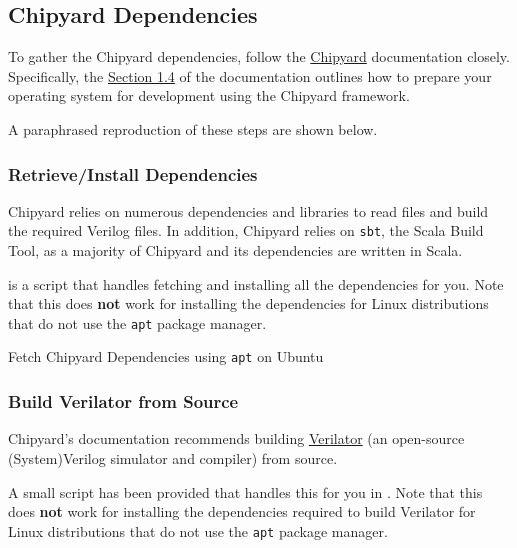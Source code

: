 \subsection{Chipyard Dependencies}\label{sec:Chipyard_Dependencies}
To gather the Chipyard dependencies, follow the \href{https://chipyard.readthedocs.io/en/latest/}{Chipyard} documentation closely.
Specifically, the \href{https://chipyard.readthedocs.io/en/latest/Chipyard-Basics/Initial-Repo-Setup.html}{Section 1.4} of the documentation outlines how to prepare your operating system for development using the Chipyard framework.

A paraphrased reproduction of these steps are shown below.

\subsubsection{Retrieve/Install Dependencies}\label{sec:Retrive_Install_Dependencies}
Chipyard relies on numerous dependencies and libraries to read files and build the required Verilog files.
In addition, Chipyard relies on \texttt{sbt}, the Scala Build Tool, as a majority of Chipyard and its dependencies are written in Scala.

 is a script that handles fetching and installing all the dependencies for you.
Note that this does \textbf{not} work for installing the dependencies for Linux distributions that do not use the \texttt{apt} package manager.

\begin{listing}[h!tbp]
\caption{Fetch Chipyard Dependencies using \texttt{apt} on Ubuntu}
\label{lst:Ubuntu_Chipyard_Deps_Setup}
\end{listing}

\subsubsection{Build Verilator from Source}\label{sec:Build_Verilator_from_Source}
Chipyard's documentation recommends building \href{https://www.veripool.org/wiki/verilator}{Verilator} (an open-source (System)Verilog simulator and compiler) from source.

A small script has been provided that handles this for you in .
Note that this does \textbf{not} work for installing the dependencies required to build Verilator for Linux distributions that do not use the \texttt{apt} package manager.

